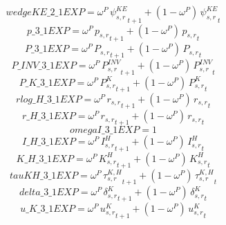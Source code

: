 \begin{dmath*}
wedgeKE\_2\_1EXP = {{\omega^{P}}}\, {{\psi^{KE}_{s,r}}}_{t+1}+\left(1-{{\omega^{P}}}\right)\, {{\psi^{KE}_{s,r}}}_{t}
\end{dmath*}
\begin{dmath*}
p\_3\_1EXP = {{\omega^{P}}}\, {{p_{s,r}}}_{t+1}+\left(1-{{\omega^{P}}}\right)\, {{p_{s,r}}}_{t}
\end{dmath*}
\begin{dmath*}
P\_3\_1EXP = {{\omega^{P}}}\, {{P_{s,r}}}_{t+1}+\left(1-{{\omega^{P}}}\right)\, {{P_{s,r}}}_{t}
\end{dmath*}
\begin{dmath*}
P\_INV\_3\_1EXP = {{\omega^{P}}}\, {{P^{INV}_{s,r}}}_{t+1}+\left(1-{{\omega^{P}}}\right)\, {{P^{INV}_{s,r}}}_{t}
\end{dmath*}
\begin{dmath*}
P\_K\_3\_1EXP = {{\omega^{P}}}\, {{P^K_{s,r}}}_{t+1}+\left(1-{{\omega^{P}}}\right)\, {{P^K_{s,r}}}_{t}
\end{dmath*}
\begin{dmath*}
rlog\_H\_3\_1EXP = {{\omega^{P}}}\, {{r_{s,r}}}_{t+1}+\left(1-{{\omega^{P}}}\right)\, {{r_{s,r}}}_{t}
\end{dmath*}
\begin{dmath*}
r\_H\_3\_1EXP = {{\omega^{P}}}\, {{r_{s,r}}}_{t+1}+\left(1-{{\omega^{P}}}\right)\, {{r_{s,r}}}_{t}
\end{dmath*}
\begin{dmath*}
omegaI\_3\_1EXP = 1
\end{dmath*}
\begin{dmath*}
I\_H\_3\_1EXP = {{\omega^{P}}}\, {{I^H_{s,r}}}_{t+1}+\left(1-{{\omega^{P}}}\right)\, {{I^H_{s,r}}}_{t}
\end{dmath*}
\begin{dmath*}
K\_H\_3\_1EXP = {{\omega^{P}}}\, {{K^H_{s,r}}}_{t+1}+\left(1-{{\omega^{P}}}\right)\, {{K^H_{s,r}}}_{t}
\end{dmath*}
\begin{dmath*}
tauKH\_3\_1EXP = {{\omega^{P}}}\, {{\tau^{K,H}_{s,r}}}_{t+1}+\left(1-{{\omega^{P}}}\right)\, {{\tau^{K,H}_{s,r}}}_{t}
\end{dmath*}
\begin{dmath*}
delta\_3\_1EXP = {{\omega^{P}}}\, {{\delta^{K}_{s,r}}}_{t+1}+\left(1-{{\omega^{P}}}\right)\, {{\delta^{K}_{s,r}}}_{t}
\end{dmath*}
\begin{dmath*}
u\_K\_3\_1EXP = {{\omega^{P}}}\, {{u^K_{s,r}}}_{t+1}+\left(1-{{\omega^{P}}}\right)\, {{u^K_{s,r}}}_{t}
\end{dmath*}
